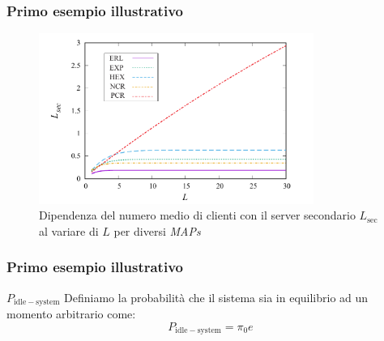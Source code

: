 \documentclass{beamer}
\begin{document}
\begin{frame}
    \frametitle{Primo esempio illustrativo}
    \begin{figure}[h]
        \centering
        \includegraphics[width=0.8\textwidth]{Tcjl81t.png}
        \caption{Dipendenza del numero medio di clienti con il server secondario $L_{\mathrm{sec}}$ al variare di $L$ per diversi \emph{MAPs}}
        \label{fig:2}
    \end{figure}
\end{frame}




\begin{frame}
    \frametitle{Primo esempio illustrativo}
    \begin{block}{$P_{\mathrm{idle-system}}$}
        Definiamo la probabilità che il sistema sia in equilibrio ad un momento arbitrario come:
        $$  P_{\mathrm{idle-system}} = \pi_0 e $$
    \end{block}
\end{frame}
\end{document}
